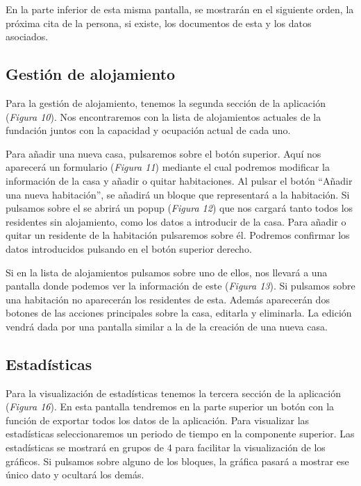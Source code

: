 En la parte inferior de esta misma pantalla, se mostrarán en el siguiente orden, la próxima cita de la persona, si existe, los documentos de esta y los datos asociados.

\subsection{Gestión de alojamiento}

Para la gestión de alojamiento, tenemos la segunda sección de la aplicación (\textit{Figura 10}). Nos encontraremos con la lista de alojamientos actuales de la fundación juntos con la capacidad y ocupación actual de cada uno. 

Para añadir una nueva casa, pulsaremos sobre el botón superior. Aquí nos aparecerá un formulario (\textit{Figura 11}) mediante el cual podremos modificar la información de la casa y añadir o quitar habitaciones. Al pulsar el botón ``Añadir una nueva habitación'', se añadirá un bloque que representará a la habitación. Si pulsamos sobre el se abrirá un popup (\textit{Figura 12}) que nos cargará tanto todos los residentes sin alojamiento, como los datos a introducir de la casa. Para añadir o quitar un residente de la habitación pulsaremos sobre él. Podremos confirmar los datos introducidos pulsando en el botón superior derecho.

Si en la lista de alojamientos pulsamos sobre uno de ellos, nos llevará a una pantalla donde podemos ver la información de este (\textit{Figura 13}). Si pulsamos sobre una habitación no aparecerán los residentes de esta. Además aparecerán dos botones de las acciones principales sobre la casa, editarla y eliminarla. La edición vendrá dada por una pantalla similar a la de la creación de una nueva casa. 

\subsection{Estadísticas}

Para la visualización de estadísticas tenemos la tercera sección de la aplicación (\textit{Figura 16}). En esta pantalla tendremos en la parte superior un botón con la función de exportar todos los datos de la aplicación. Para visualizar las estadísticas seleccionaremos un periodo de tiempo en la componente superior. Las estadísticas se mostrará en grupos de 4 para facilitar la visualización de los gráficos. Si pulsamos sobre alguno de los bloques, la gráfica pasará a mostrar ese único dato y ocultará los demás.

